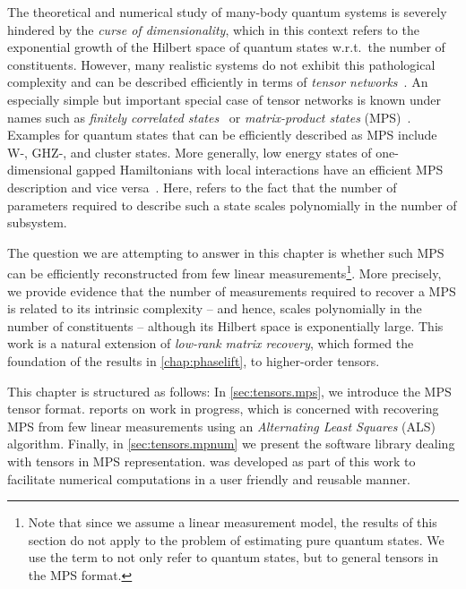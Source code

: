 

The theoretical and numerical study of many-body quantum systems is severely hindered by the \emph{curse of dimensionality}, which in this context refers to the exponential growth of the Hilbert space of quantum states w.r.t.\ the number of constituents.
However, many realistic systems do not exhibit this pathological complexity and can be described efficiently in terms of \emph{tensor networks}~\cite{}.
An especially simple but important special case of tensor networks is known under names such as \emph{finitely correlated states}~\cite{Fannes_1992_Finitely} or \emph{matrix-product states} (MPS)~\cite{Garcia_2006_Matrix,Verstraete_2008_Matrix,Orus_2014_Practical}.
Examples for quantum states that can be efficiently described as MPS include W-, GHZ-, and cluster states.
More generally, low energy states of one-dimensional gapped Hamiltonians with local interactions have an efficient MPS description and vice versa~\cite{}.
Here,  refers to the fact that the number of parameters required to describe such a state scales polynomially in the number of subsystem.

The question we are attempting to answer in this chapter is whether such MPS can be efficiently reconstructed from few linear measurements\footnote{%
  Note that since we assume a linear measurement model, the results of this section do not apply to the problem of estimating pure quantum states.
  We use the term  to not only refer to quantum states, but to general tensors in the MPS format.
}.
More precisely, we provide evidence that the number of measurements required to recover a MPS is related to its intrinsic complexity -- and hence, scales polynomially in the number of constituents -- although its Hilbert space is exponentially large.
This work is a natural extension of \emph{low-rank matrix recovery}, which formed the foundation of the results in \cref{chap:phaselift}, to higher-order tensors.\\

This chapter is structured as follows:
In \cref{sec:tensors.mps}, we introduce the MPS tensor format.
 reports on work in progress, which is concerned with recovering MPS from few linear measurements using an \emph{Alternating Least Squares} (ALS) algorithm.
Finally, in \cref{sec:tensors.mpnum} we present the software library \mpnum dealing with tensors in MPS representation.
\mpnum was developed as part of this work to facilitate numerical computations in a user friendly and reusable manner.


